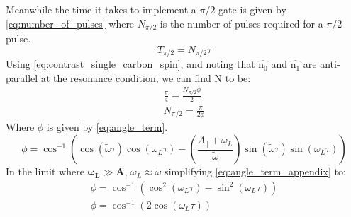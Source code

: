 Meanwhile the time it takes to implement a $\pi/2$-gate is given by \cref{eq:number_of_pulses} where $N_{\pi/2} $ is the number of pulses required for a $\pi/2$-pulse.
\begin{equation}
    T_{\pi/2}= N_{\pi/2} \tau
    \label{eq:number_of_pulses}
\end{equation}
Using \cref{eq:contrast_single_carbon_spin}, and noting that $\hat{\mathrm{n_0}}$ and $\hat{\mathrm{n_1}}$ are anti-parallel at the resonance condition, we can find N to be:
\begin{align}
    \frac{\pi}{4} = \frac{N_{\pi/2} \phi}{2}\\
    N_{\pi/2}=\frac{\pi}{2\phi}
\end{align}
Where $\phi$ is given by \cref{eq:angle_term}.
\begin{equation}
    \phi =  \cos^{-1}\left(\cos(\tilde{\omega} \tau) \cos(\omega_L \tau)-\left(\frac{ A_ \parallel + \omega_L }{ \tilde{ \omega}}\right) \sin(\tilde{\omega} \tau)\sin(\omega_L \tau)\right)
    \label{eq:angle_term_appendix}
\end{equation}
In the limit where $\bm{\omega_L} \gg \bm{A}$, $\omega_L \approx \tilde{\omega}$ simplifying \cref{eq:angle_term_appendix} to:
\begin{align}
    \phi = \cos^{-1} \left(\cos^2(\omega_L \tau) -  \sin^2(\omega_L \tau) \right)\\
    \phi = \cos^{-1} \left(2 \cos(\omega_L \tau)\right)
\end{align}
